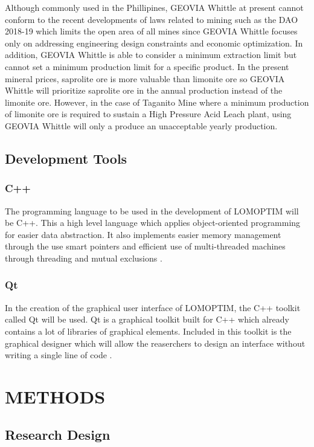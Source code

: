 \documentclass[12pt]{report}
\begin{document}
Although commonly used in the Phillipines, GEOVIA Whittle at present cannot conform to the recent developments of laws related to mining such as the DAO 2018-19 \cite{DAO2018-19} which limits the open area of all mines since GEOVIA Whittle focuses only on addressing engineering design constraints and economic optimization.
In addition, GEOVIA Whittle is able to consider a minimum extraction limit but cannot set a minimum production limit for a specific product.
In the present mineral prices, saprolite ore is more valuable than limonite ore so GEOVIA Whittle will prioritize saprolite ore in the annual production instead of the limonite ore.
However, in the case of Taganito Mine where a minimum production of limonite ore is required to sustain a High Pressure Acid Leach plant, using GEOVIA Whittle will only a produce an unacceptable yearly production.

\section{Development Tools}

\subsection{C++}

The programming language to be used in the development of LOMOPTIM will be C++.
This a high level language which applies object-oriented programming for easier data abstraction.
It also implements easier memory management through the use smart pointers and efficient use of multi-threaded machines through threading and mutual exclusions \cite{cpp}.

\subsection{Qt}

In the creation of the graphical user interface of LOMOPTIM, the C++ toolkit called Qt will be used.
Qt is a graphical toolkit built for C++ which already contains a lot of libraries of graphical elements.
Included in this toolkit is the graphical designer which will allow the reaserchers to design an interface without writing a single line of code \cite{qt}.

\chapter{METHODS}

\section{Research Design}
\end{document}
